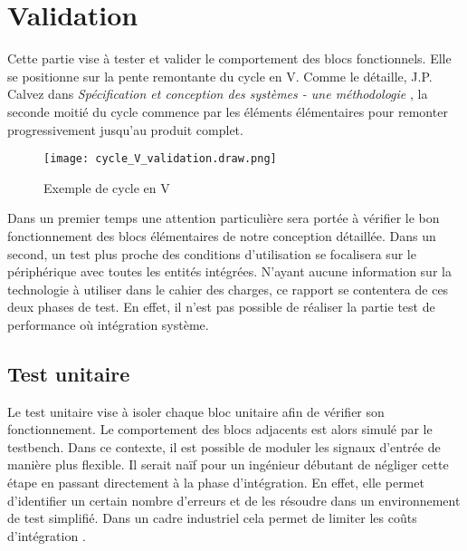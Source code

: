 \section{Validation}

Cette partie vise à tester et valider le comportement des blocs fonctionnels.
Elle se positionne sur la pente remontante du cycle en V.
Comme le détaille, J.P. Calvez dans \textit{Spécification et conception des systèmes - une méthodologie} \cite{Calvez_2}, la seconde moitié du cycle commence par les éléments élémentaires pour remonter progressivement jusqu'au produit complet.
\begin{figure}[H]
    \centering
    \texttt{[image: cycle\_V\_validation.draw.png]}
    \caption{Exemple de cycle en V }
    \label{fig:cycle_v}
\end{figure}
Dans un premier temps une attention particulière sera portée à vérifier le bon fonctionnement des blocs élémentaires de notre conception détaillée. 
Dans un second, un test plus proche des conditions d'utilisation se focalisera sur le périphérique avec toutes les entités intégrées.
N'ayant aucune information sur la technologie à utiliser dans le cahier des charges, ce rapport se contentera de ces deux phases de test. 
En effet, il n'est pas possible de réaliser la partie test de performance où intégration système.

\subsection{Test unitaire}
Le test unitaire vise à isoler chaque bloc unitaire afin de vérifier son fonctionnement.
Le comportement des blocs adjacents est alors simulé par le testbench.
Dans ce contexte, il est possible de moduler les signaux d'entrée de manière plus flexible.
Il serait naïf pour un ingénieur débutant de négliger cette étape en passant directement à la phase d'intégration.
En effet, elle permet d'identifier un certain nombre d'erreurs et de les résoudre dans un environnement de test simplifié.
Dans un cadre industriel cela permet de limiter les coûts d'intégration \cite{Calvez_2}.
